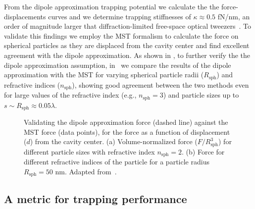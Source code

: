 From the dipole approximation trapping potential we calculate the the force-displacements curves and we determine trapping stiffnesses
of $\kappa \approx 0.5$ fN/nm, an order of magnitude larger that diffraction-limited free-space optical tweezers~\cite{ownpub1}. To validate this findings
we employ the MST formalism to calculate the force on spherical particles as they are displaced from the cavity center and find excellent
agreement with the dipole approximation. As shown in , to further verify the the dipole approximation assumption, in~\cite{ownpub3} we compare the results of the dipole approximation with the MST
for varying spherical particle radii ($R_\text{sph}$) and refractive indices ($n_\text{sph}$), showing good agreement between the two methods
even for large values of the refractive index (e.g., $n_\text{sph}=3$) and particle sizes up to $s \sim R_\text{sph}\approx 0.05 \lambda$.
\begin{figure}[tb]
    \centering
    \caption{Validating the dipole approximation force (dashed line) against the MST force (data points), for the force as a function of displacement ($d$) from the cavity center.
    (a) Volume-normalized force ($F/R^3_\text{sph}$) for different particle sizes with refractive index $n_\text{sph}=2$. (b) Force for different refractive indices of the particle for a particle radius $R_\text{sph}=50$ nm. Adapted from~\cite{ownpub3}.}
    \label{fig:SPIE}
\end{figure}

\subsection*{A metric for trapping performance~\cite{ownpub1}}


